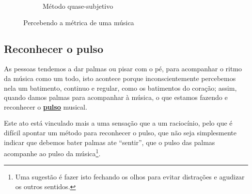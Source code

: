 \begin{figure}[h]
\begin{subfigure}[c]{0.45\textwidth}
\caption{Método quase-subjetivo}
\label{fig:fluxodancanopulso2}
\end{subfigure}
    \caption{Percebendo a métrica de uma música}\label{fig:fluxodancanopulso}
\end{figure}



\subsection{Reconhecer o pulso}
\label{subsec:perpulsomusica}
As pessoas tendemos a dar palmas ou pisar com o pé, para acompanhar o ritmo da música como um todo,
isto acontece porque inconscientemente percebemos nela um batimento,
continuo e regular, como os batimentos do coração;
assim, quando damos palmas para acompanhar à música, o que estamos 
fazendo e reconhecer o  \hyperref[ref:Pulso]{\textbf{pulso}} musical. 

Este ato está vinculado mais a uma sensação que a um raciocínio,
pelo que é difícil apontar um método para reconhecer o pulso,
que não seja simplesmente indicar que debemos bater palmas ate ``sentir'',
que o pulso das palmas acompanhe ao pulso da música\footnote{Uma
sugestão é fazer isto fechando os olhos para evitar distrações e agudizar os outros sentidos. }.

